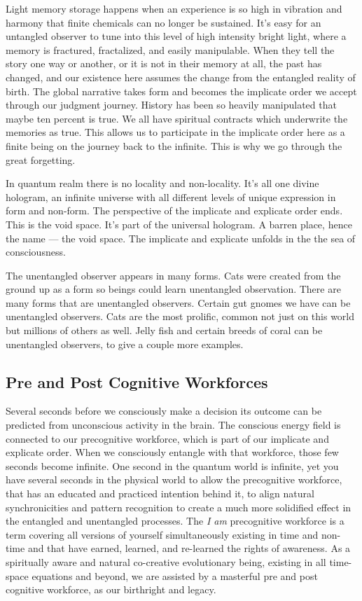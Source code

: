 Light memory storage happens when an experience is so high in vibration
and harmony that finite chemicals can no longer be sustained. It's easy
for an untangled observer to tune into this level of high intensity
bright light, where a memory is fractured, fractalized, and easily
manipulable. When they tell the story one way or another, or it is not
in their memory at all, the past has changed, and our existence here
assumes the change from the entangled reality of birth. The global
narrative takes form and becomes the implicate order we accept through
our judgment journey. History has been so heavily manipulated that maybe
ten percent is true. We all have spiritual contracts which underwrite
the memories as true. This allows us to participate in the implicate
order here as a finite being on the journey back to the infinite. This
is why we go through the great forgetting.

In quantum realm there is no locality and non-locality. It's all one
divine hologram, an infinite universe with all different levels of
unique expression in form and non-form. The perspective of the implicate
and explicate order ends. This is the void space. It's part of the
universal hologram. A barren place, hence the name --- the void space.
The implicate and explicate unfolds in the the sea of consciousness.

The unentangled observer appears in many forms. Cats were created from
the ground up as a form so beings could learn unentangled observation.
There are many forms that are unentangled observers. Certain gut gnomes
we have can be unentangled observers. Cats are the most prolific, common
not just on this world but millions of others as well. Jelly fish and
certain breeds of coral can be unentangled observers, to give a couple
more examples.

\subsection*{Pre and Post Cognitive
Workforces}\label{pre-and-post-cognitive-workforces}

Several seconds before we consciously make a decision its outcome can be
predicted from unconscious activity in the brain. The conscious energy
field is connected to our precognitive workforce, which is part of our
implicate and explicate order. When we consciously entangle with that
workforce, those few seconds become infinite. One second in the quantum
world is infinite, yet you have several seconds in the physical world to
allow the precognitive workforce, that has an educated and practiced
intention behind it, to align natural synchronicities and pattern
recognition to create a much more solidified effect in the entangled and
unentangled processes. The \emph{I am} precognitive workforce is a term
covering all versions of yourself simultaneously existing in time and
non-time and that have earned, learned, and re-learned the rights of
awareness. As a spiritually aware and natural co-creative evolutionary
being, existing in all time-space equations and beyond, we are assisted
by a masterful pre and post cognitive workforce, as our birthright and
legacy.

